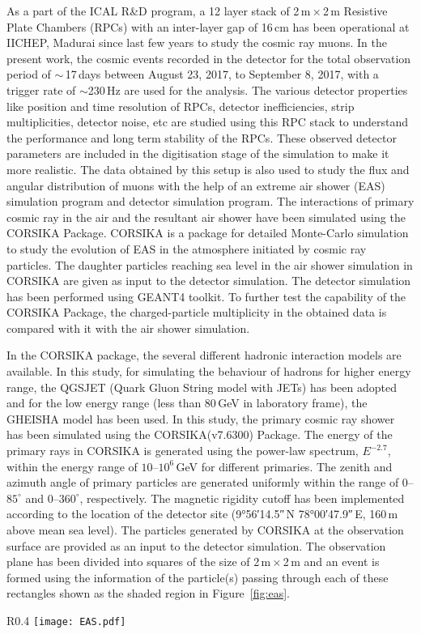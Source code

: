 As a part of the ICAL R\&D program, a 12 layer stack of 2\,m\,$\times$\,2\,m Resistive Plate Chambers (RPCs) with an inter-layer gap of 16\,cm has been operational at IICHEP, Madurai since last few years to study the cosmic ray muons. In the present work, the cosmic events recorded in the detector for the total observation period of $\sim$\,17\,days between August 23, 2017, to September 8, 2017, with a trigger rate of $\sim$230\,Hz are used for the analysis. The various detector properties like position and time resolution of RPCs, detector inefficiencies, strip multiplicities, detector noise, etc are studied using this RPC stack to understand the performance and long term stability of the RPCs. These observed detector parameters are included in the digitisation stage of the simulation to make it more realistic.\cite{pethu1} The data obtained by this setup is also used to study the flux and angular distribution of muons with the help of an extreme air shower (EAS) simulation program and detector simulation program. The interactions of primary cosmic ray in the air and the resultant air shower have been simulated using the CORSIKA Package\cite{corsika763}. CORSIKA is a package for detailed Monte-Carlo simulation to study the evolution of EAS in the atmosphere initiated by cosmic ray particles. The daughter particles reaching sea level in the air shower simulation in CORSIKA are given as input to the detector simulation. The detector simulation has been performed using GEANT4 toolkit\cite{geant4}. To further test the capability of the CORSIKA Package, the charged-particle multiplicity in the obtained data is compared with it with the air shower simulation.

In the CORSIKA package, the several different hadronic interaction models are available. In this study, for simulating the behaviour of hadrons for higher energy range, the QGSJET (Quark Gluon String model with JETs)\cite{corsika763} has been adopted and for the low energy range (less than 80\,GeV in laboratory frame), the GHEISHA model has been used. In this study, the primary cosmic ray shower has been simulated using the CORSIKA(v7.6300) Package. The energy of the primary rays in CORSIKA is generated using the power-law spectrum, $E^{-2.7}$, within the energy range of \mbox{$10$--$10^{6}$\,GeV} for different primaries. The zenith and azimuth angle of primary particles are generated uniformly within the range of \mbox{$0$--$85^\circ$} and \mbox{$0$--$360^\circ$}, respectively. The magnetic rigidity cutoff has been implemented according to the location of the detector site (\ang{9;56;14.5}\,N \ang{78;00;47.9}\,E, 160\,m above mean sea level). The particles generated by CORSIKA at the observation surface are provided as an input to the detector simulation. The observation plane has been divided into squares of the size of 2\,m\,$\times$\,2\,m and an event is formed using the information of the particle(s) passing through each of these rectangles shown as the shaded region in Figure~\ref{fig:eas}.
\begin{wrapfigure}{R}{0.4\linewidth}
  \centering
  \texttt{[image: EAS.pdf]} 
  \caption{Shower of particles initiated by primary cosmic ray reaching observation surface.}
  \label{fig:eas}
\end{wrapfigure}


